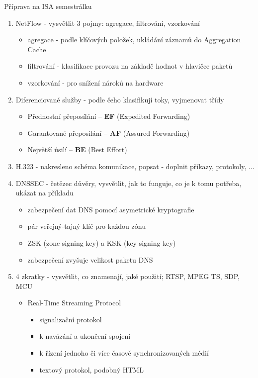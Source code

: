\documentclass[12pt,a4paper,titlepage,final]{article}
\begin{document}
{ \huge Příprava na ISA semestrálku }

\begin{enumerate}
	\item NetFlow - vysvětlit 3 pojmy: agregace, filtrování, vzorkování
	\begin{itemize}
		\item agregace - podle klíčových položek, ukládání záznamů do Aggregation Cache
		\item filtrování - klasifikace provozu na základě hodnot v hlavičce paketů
		\item vzorkování - pro snížení nároků na hardware	
	\end{itemize}

	\item Diferenciované služby - podle čeho klasifikují toky, vyjmenovat třídy
	\begin{itemize}
		\item Přednostní přeposílání -- \textbf{EF} (Expedited Forwarding)
		\item Garantované přeposílání -- \textbf{AF} (Assured Forwarding)
		\item Největší úsilí -- \textbf{BE} (Best Effort)
	\end{itemize}
	
	
	
	
	\item H.323 - nakresleno schéma komunikace, popsat - doplnit příkazy, protokoly, ...
	
	\item DNSSEC - řetězec důvěry, vysvětlit, jak to funguje, co je k tomu potřeba, ukázat na příkladu
	\begin{itemize}
		\item zabezpečení dat DNS pomocí asymetrické kryptografie
		\item pár veřejný-tajný klíč pro každou zónu
		\item ZSK (zone signing key) a KSK (key signing key)
		\item zabezpečení zvyšuje velikost paketu DNS
	\end{itemize}

	\item 4 zkratky - vysvětlit, co znamenají, jaké použití; RTSP, MPEG TS, SDP, MCU
	\begin{itemize}
		\item Real-Time Streaming Protocol
		\begin{itemize}
			\item signalizační protokol
			\item k navázání a ukončení spojení
			\item k řízení jednoho či více časově synchronizovaných médií
			\item textový protokol, podobný HTML
		\end{itemize}


\end{itemize}
\end{enumerate}
\end{document}
